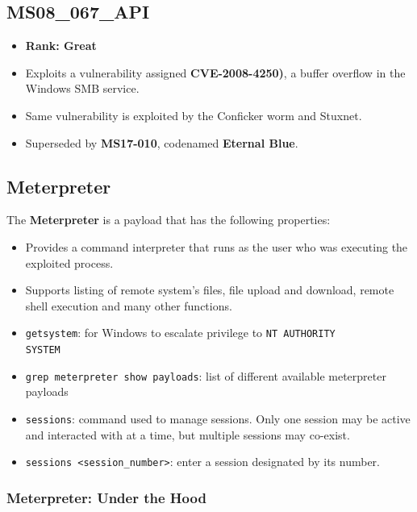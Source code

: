 \documentclass[12pt, letterpaper]{article}
\begin{document}
\subsection*{MS08\_067\_API}

\begin{itemize}
    \item \textbf{Rank: Great}
    \item Exploits a vulnerability assigned \textbf{CVE-2008-4250)}, a buffer overflow in the Windows SMB service.
    \item Same vulnerability is exploited by the Conficker worm and Stuxnet.
    \item Superseded by \textbf{MS17-010}, codenamed \textbf{Eternal Blue}.
\end{itemize}

\subsection*{Meterpreter}

The \textbf{Meterpreter} is a payload that has the following properties:

\begin{itemize}
    \item Provides a command interpreter that runs as the user who was executing the exploited process.
    \item Supports listing of remote system's files, file upload and download, remote shell execution and many other functions.
    \item \texttt{getsystem}: for Windows to escalate privilege to \texttt{NT AUTHORITY\\SYSTEM}
    \item \texttt{grep meterpreter show payloads}: list of different available meterpreter payloads
    \item \texttt{sessions}: command used to manage sessions. Only one session may be active and interacted with at a time, but multiple sessions may co-exist.
    \item \texttt{sessions <session\_number>}: enter a session designated by its number.
\end{itemize}

\subsubsection*{Meterpreter: Under the Hood}
\end{document}
